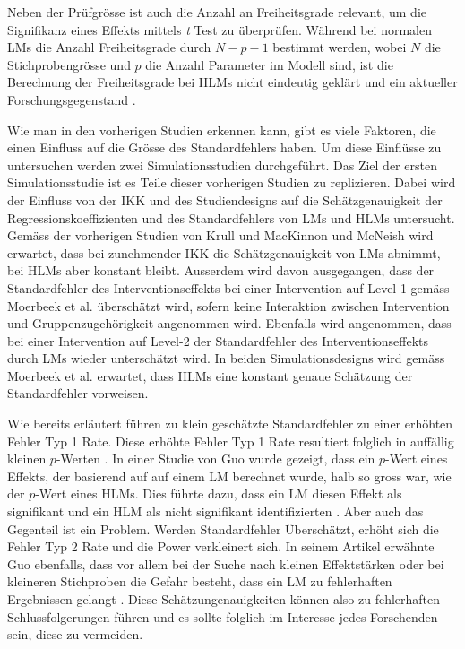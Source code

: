\documentclass[12pt]{article}\usepackage[]{graphicx}\usepackage[]{color}
\begin{document}
Neben der Prüfgrösse ist auch die Anzahl an Freiheitsgrade relevant, um die Signifikanz eines Effekts mittels \textit{t} Test zu überprüfen. Während bei normalen LMs die Anzahl Freiheitsgrade durch $N - p - 1$ bestimmt werden, wobei $N$ die Stichprobengrösse und $p$ die Anzahl Parameter im Modell sind, ist die Berechnung der Freiheitsgrade bei HLMs nicht eindeutig geklärt und ein aktueller Forschungsgegenstand \citep{mcneish2014analyzing,raudenbush2002hierarchical,SnijdersTomA.B2012Ma:a}.

Wie man in den vorherigen Studien erkennen kann, gibt es viele Faktoren, die einen Einfluss auf die Grösse des Standardfehlers haben. Um diese Einflüsse zu untersuchen werden zwei Simulationsstudien durchgeführt. Das Ziel der ersten Simulationsstudie ist es Teile dieser vorherigen Studien zu replizieren. Dabei wird der Einfluss von der IKK und des Studiendesigns auf die Schätzgenauigkeit der Regressionskoeffizienten und des Standardfehlers von LMs und HLMs untersucht. Gemäss der vorherigen Studien von Krull und MacKinnon \citeyearpar{krullmackinnon2010mediation} und McNeish \citeyearpar{mcneish2014analyzing} wird erwartet, dass bei zunehmender IKK die Schätzgenauigkeit von LMs abnimmt, bei HLMs aber konstant bleibt. Ausserdem wird davon ausgegangen, dass der Standardfehler des Interventionseffekts bei einer Intervention auf Level-1 gemäss Moerbeek et al. \citeyearpar{MOERBEEK2003341} überschätzt wird, sofern keine Interaktion zwischen Intervention und Gruppenzugehörigkeit angenommen wird. Ebenfalls wird angenommen, dass bei einer Intervention auf Level-2 der Standardfehler des Interventionseffekts durch LMs wieder unterschätzt wird. In beiden Simulationsdesigns wird gemäss Moerbeek et al. \citeyearpar{MOERBEEK2003341} erwartet, dass HLMs eine konstant genaue Schätzung der Standardfehler vorweisen.

Wie bereits erläutert führen zu klein geschätzte Standardfehler zu einer erhöhten Fehler Typ 1 Rate. Diese erhöhte Fehler Typ 1 Rate resultiert folglich in auffällig kleinen $p$-Werten \citep{raudenbush2002hierarchical, SnijdersTomA.B2012Ma:a}. In einer Studie von Guo \citeyearpar{guo2005groupeddatahlm} wurde gezeigt, dass ein $p$-Wert eines Effekts, der basierend auf auf einem LM berechnet wurde, halb so gross war, wie der $p$-Wert eines HLMs. Dies führte dazu, dass ein LM diesen Effekt als signifikant und ein HLM als nicht signifikant identifizierten \citep{guo2005groupeddatahlm}. Aber auch das Gegenteil ist ein Problem. Werden Standardfehler Überschätzt, erhöht sich die Fehler Typ 2 Rate und die Power verkleinert sich. In seinem Artikel erwähnte Guo ebenfalls, dass vor allem bei der Suche nach kleinen Effektstärken oder bei kleineren Stichproben die Gefahr besteht, dass ein LM zu fehlerhaften Ergebnissen gelangt \citep{guo2005groupeddatahlm}. Diese Schätzungenauigkeiten können also zu fehlerhaften Schlussfolgerungen führen und es sollte folglich im Interesse jedes Forschenden sein, diese zu vermeiden. 
\end{document}
